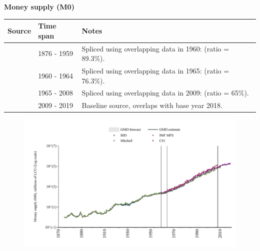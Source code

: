 \documentclass[12pt,a4paper,landscape]{article}
\begin{document}
\begin{adjustbox}{max totalsize={\paperwidth}{\paperheight},center}
\begin{minipage}[t][\textheight][t]{\textwidth}
\vspace*{0.5cm}
{}
\begin{center}
{\Large\bfseries Money supply (M0)}
\end{center}
\vspace{0.5cm}
\begin{table}[H]
\centering
\small
\begin{tabular}{|l|l|l|}
\hline
\textbf{Source} & \textbf{Time span} & \textbf{Notes} \\
\hline
\rowcolor{white}\cite{Mitchell}& 1876 - 1959 &Spliced using overlapping data in 1960: (ratio = 89.3\%). \\
\rowcolor{lightgray}\cite{CS1_ZAF}& 1960 - 1964 &Spliced using overlapping data in 1965: (ratio = 76.3\%). \\
\rowcolor{white}\cite{IMF_MFS}& 1965 - 2008 &Spliced using overlapping data in 2009: (ratio = 65\%). \\
\rowcolor{lightgray}\cite{CS1_ZAF}& 2009 - 2019 &Baseline source, overlaps with base year 2018. \\
\hline
\end{tabular}
\end{table}
\begin{figure}[H]
\centering
\includegraphics[width=\textwidth,height=0.6\textheight,keepaspectratio]{graphs/ZAF_M0.pdf}
\end{figure}
\end{minipage}
\end{adjustbox}
\end{document}
